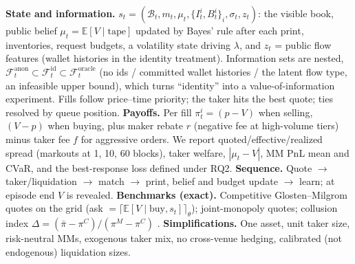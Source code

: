 \documentclass[11pt]{article}
\newcommand{\E}{\mathbb{E}}
\begin{document}
\textbf{State and information.} $s_t=(\mathcal{B}_t, m_t, \mu_t, \{I^i_t,B^i_t\}_i, \sigma_t, z_t)$: the visible book, public belief $\mu_t=\E[V\mid\text{tape}]$ updated by Bayes' rule after each print, inventories, request budgets, a volatility state driving $\lambda$, and $z_t$ = public flow features (wallet histories in the identity treatment). Information sets are nested, $\mathcal{F}^{\text{anon}}_t\subset\mathcal{F}^{\text{id}}_t\subset\mathcal{F}^{\text{oracle}}_t$ (no ids / committed wallet histories / the latent flow type, an infeasible upper bound), which turns ``identity'' into a value-of-information experiment. Fills follow price--time priority; the taker hits the best quote; ties resolved by queue position. \textbf{Payoffs.} Per fill $\pi^i_t=(p-V)$ when selling, $(V-p)$ when buying, plus maker rebate $r$ (negative fee at high-volume tiers) minus taker fee $f$ for aggressive orders. We report quoted/effective/realized spread (markouts at 1, 10, 60 blocks), taker welfare, $|\mu_t-V|$, MM PnL mean and CVaR, and the best-response loss defined under RQ2. \textbf{Sequence.} Quote $\to$ taker/liquidation $\to$ match $\to$ print, belief and budget update $\to$ learn; at episode end $V$ is revealed. \textbf{Benchmarks (exact).} Competitive Glosten--Milgrom quotes on the grid (ask $=\lceil \E[V\mid \text{buy},s_t]\rceil_\theta$); joint-monopoly quotes; collusion index $\Delta=(\bar\pi-\pi^C)/(\pi^M-\pi^C)$ \cite{calvano}. \textbf{Simplifications.} One asset, unit taker size, risk-neutral MMs, exogenous taker mix, no cross-venue hedging, calibrated (not endogenous) liquidation sizes.
\end{document}
